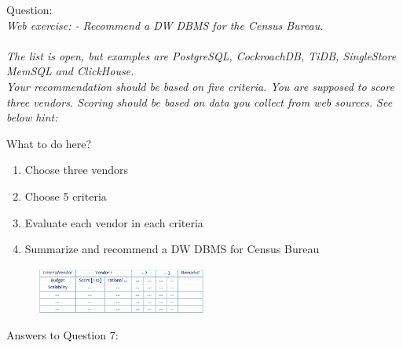 Question:\\
\emph{
    Web exercise:
- Recommend a DW DBMS for the Census Bureau.\\\\ The list is open, but examples
are PostgreSQL, CockroachDB, TiDB, SingleStore MemSQL and ClickHouse.\\ Your
recommendation should be based on five criteria. You are supposed to score
three vendors. Scoring should be based on data you collect from web sources.
See below hint:
}

What to do here?
\begin{enumerate}
    \item Choose three vendors
    \item Choose 5 criteria
    \item Evaluate each vendor in each criteria
    \item Summarize and recommend a DW DBMS for Census Bureau
  \end{enumerate}

\begin{figure}[h] %
    \centering
    \includegraphics[width=0.5\textwidth]{Figures/Q7_QUESTION_table.PNG}
    \label{fig:my_image}
\end{figure}

Answers to Question 7:

